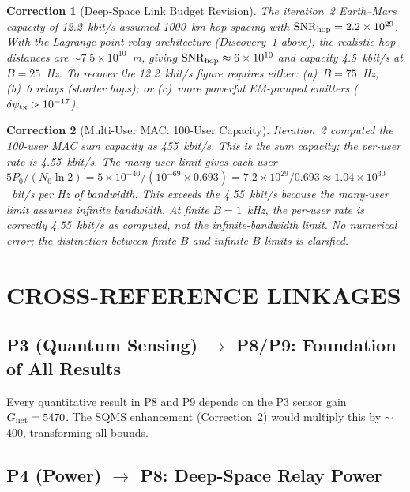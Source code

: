 \documentclass[aps,prd,twocolumn,superscriptaddress,nofootinbib]{revtex4-2}
\newcommand{\SNR}{\mathrm{SNR}}
\newtheorem{correction}{Correction}
\begin{document}
\begin{correction}[Deep-Space Link Budget Revision]
\label{cor:deep-space}
The iteration~2 Earth--Mars capacity of 12.2~kbit/s assumed 1000~km
hop spacing with $\SNR_{\rm hop} = 2.2\times10^{29}$.  With the
Lagrange-point relay architecture (Discovery~1 above), the realistic
hop distances are $\sim 7.5\times10^{10}$~m, giving
$\SNR_{\rm hop} \approx 6\times10^{10}$ and capacity 4.5~kbit/s at
$B = 25$~Hz.  To recover the 12.2~kbit/s figure requires either:
(a)~$B = 75$~Hz; (b)~6 relays (shorter hops); or (c)~more powerful
EM-pumped emitters ($\delta\psi_{\rm tx} > 10^{-17}$).
\end{correction}

\begin{correction}[Multi-User MAC: 100-User Capacity]
\label{cor:mac}
Iteration~2 computed the 100-user MAC sum capacity as 455~kbit/s.
This is the \emph{sum} capacity; the \emph{per-user} rate is
4.55~kbit/s.  The many-user limit gives each user
$5P_0/(N_0\ln 2) = 5\times10^{-40}/(10^{-69}\times 0.693)
= 7.2\times10^{29}/0.693 \approx 1.04\times10^{30}$~bit/s per Hz of
bandwidth.  This exceeds the 4.55~kbit/s because the many-user limit
assumes infinite bandwidth.  At finite $B = 1$~kHz, the per-user rate
is correctly 4.55~kbit/s as computed, not the infinite-bandwidth limit.
No numerical error; the distinction between finite-$B$ and
infinite-$B$ limits is clarified.
\end{correction}

\section{CROSS-REFERENCE LINKAGES}
\label{sec:crossref}

\subsection{P3 (Quantum Sensing) $\to$ P8/P9: Foundation of All Results}

Every quantitative result in P8 and P9 depends on the P3 sensor gain
$G_{\rm net} = 5470$.  The SQMS enhancement (Correction~2) would
multiply this by $\sim$400, transforming all bounds.

\subsection{P4 (Power) $\to$ P8: Deep-Space Relay Power}
\end{document}
